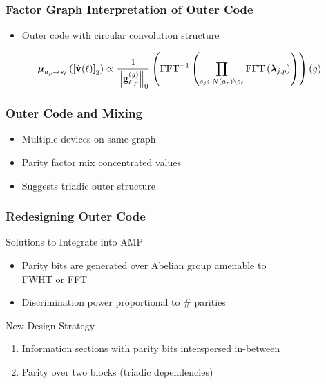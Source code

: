 
\begin{frame}
\frametitle{Factor Graph Interpretation of Outer Code}
\begin{center}
\scalebox{0.9}{}
\end{center}
\begin{itemize}
\item Outer code with circular convolution structure
\end{itemize}
\begin{equation*}
\boldsymbol{\mu}_{a_p \to s_{\ell}} \left( \left[ \hat{\mathbf{v}}(\ell) \right]_2 \right)
\propto
\frac{1}{\left\| \mathbf{g}_{\ell, p}^{(g)} \right\|_0}
\left( \operatorname{FFT}^{-1} \left( \prod_{s_j \in N(a_p) \setminus s_{\ell}} \operatorname{FFT} \left( \boldsymbol{\lambda}_{j,p} \right) \right) \right) (g)
\end{equation*}
\end{frame}


\begin{frame}
\frametitle{Outer Code and Mixing}
\begin{center}
\scalebox{0.9}{}
\end{center}
\begin{itemize}
\item Multiple devices on same graph
\item Parity factor mix concentrated values
\item Suggests triadic outer structure
\end{itemize}
\end{frame}


\begin{frame}
\frametitle{Redesigning Outer Code}
\begin{block}{Solutions to Integrate into AMP}
\begin{itemize}
\item Parity bits are generated over Abelian group amenable to\\
FWHT or FFT
\item Discrimination power proportional to \# parities
\end{itemize}
\end{block}
\begin{center}

\end{center}
\begin{block}{New Design Strategy}
\begin{enumerate}
\item Information sections with parity bits interspersed in-between
\item Parity over two blocks (triadic dependencies)
\end{enumerate}
\end{block}
\end{frame}

